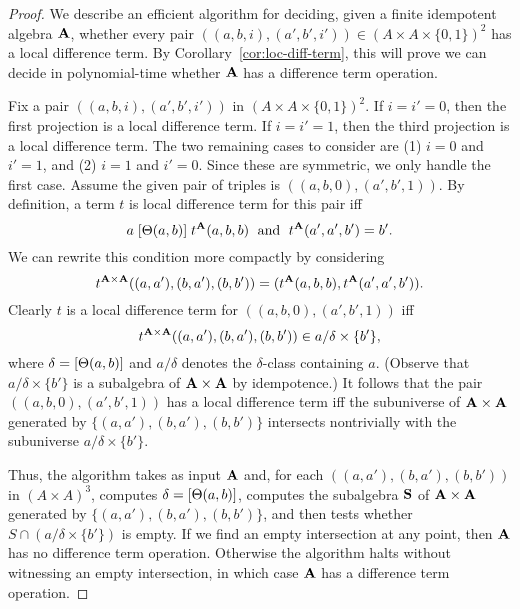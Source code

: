 \begin{proof}
  We describe an efficient algorithm for deciding,
  given a finite idempotent algebra $\mathbf{A}$,
  whether every pair $((a,b,i), (a',b',i')) \in (A\times A \times \{0,1\})^2$ has a local
  difference term.  By Corollary~\ref{cor:loc-diff-term}, this will prove we
  can decide in polynomial-time whether $\mathbf{A}$ has a difference term operation.

  Fix a pair
  $((a,b,i), (a',b',i'))$ in $(A\times A \times \{0,1\})^2$. If $i = i' = 0$,
  then the first projection is a local difference term. If $i = i' = 1$,
    then the third projection is a local difference term. The two remaining cases to
    consider are (1) $i = 0$ and $i'=1$, and (2)
    $i = 1$ and $i'=0$. Since these are symmetric, we only handle the
    first case. Assume  the given pair of triples is
    $((a,b,0), (a',b',1))$.  By definition, a term $t$ is local difference term
    for this pair iff
    \[
    a\mathrel{[\Theta(a,b)]} t^{\mathbf{A}}(a,b,b) \; \text{ and } \;
    t^{\mathbf{A}}(a',a',b') = b'.
    \]
    We can rewrite this condition more compactly by
    considering
    \[t^{\mathbf{A}\times \mathbf{A}}((a,a'), (b,a'), (b,b')) =
    (t^{\mathbf{A}}(a,b,b),t^{\mathbf{A}}(a',a',b')).\]
    Clearly $t$ is a local difference term for
    $((a,b,0), (a',b',1))$ iff
    \[
    t^{\mathbf{A}\times \mathbf{A}}((a,a'), (b,a'), (b,b'))\in a/\delta \times \{b'\},
    \]
    where $\delta = [\Theta(a,b)]$ and $a/\delta$ denotes the
    $\delta$-class containing $a$.
    (Observe that $a/\delta \times \{b'\}$ is a subalgebra of $\mathbf{A} \times \mathbf{A}$
    by idempotence.)
    It follows that the pair
    $((a,b,0), (a',b',1))$ has a local difference term iff
    the subuniverse of $\mathbf{A}\times \mathbf{A}$ generated by
    $\{(a,a'), (b,a'), (b,b')\}$ intersects nontrivially with the subuniverse
    $a/\delta \times \{b'\}$.

    Thus, the algorithm takes as input $\mathbf{A}$ and, for each
    $((a,a'), (b,a'), (b,b'))$ in $(A\times A)^3$, computes
    $\delta = [\Theta(a,b)]$, computes the subalgebra
    $\mathbf{S}$ of $\mathbf{A}\times \mathbf{A}$ generated by
    $\{(a,a'), (b,a'), (b,b')\}$, and then
    tests whether $S \cap (a/\delta \times \{b'\})$ is empty.
    If we find an empty intersection at any point, then
    $\mathbf{A}$ has no difference term operation.
    Otherwise the algorithm halts without witnessing an empty
    intersection, in which case $\mathbf{A}$ has a difference term operation.


\end{proof}
